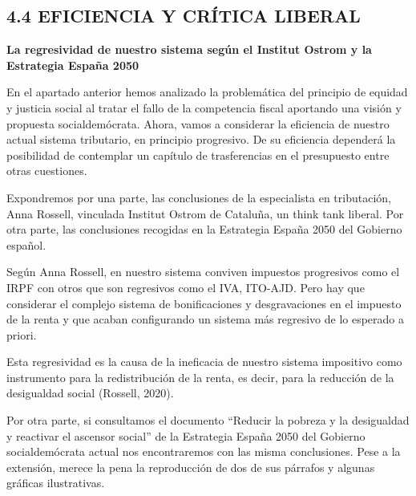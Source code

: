 \documentclass[
]{article}
\begin{document}
\hypertarget{eficiencia-y-cruxedtica-liberal}{%
\subsection{4.4 EFICIENCIA Y CRÍTICA
LIBERAL}\label{eficiencia-y-cruxedtica-liberal}}

\textbf{La regresividad de nuestro sistema según el Institut Ostrom y la
Estrategia España 2050}

En el apartado anterior hemos analizado la problemática del principio de
equidad y justicia social al tratar el fallo de la competencia fiscal
aportando una visión y propuesta socialdemócrata. Ahora, vamos a
considerar la eficiencia de nuestro actual sistema tributario, en
principio progresivo. De su eficiencia dependerá la posibilidad de
contemplar un capítulo de trasferencias en el presupuesto entre otras
cuestiones.

Expondremos por una parte, las conclusiones de la especialista en
tributación, Anna Rossell, vinculada Institut Ostrom de Cataluña, un
think tank liberal. Por otra parte, las conclusiones recogidas en la
Estrategia España 2050 del Gobierno español.

Según Anna Rossell, en nuestro sistema conviven impuestos progresivos
como el IRPF con otros que son regresivos como el IVA, ITO-AJD. Pero hay
que considerar el complejo sistema de bonificaciones y desgravaciones en
el impuesto de la renta y que acaban configurando un sistema más
regresivo de lo esperado a priori.

Esta regresividad es la causa de la ineficacia de nuestro sistema
impositivo como instrumento para la redistribución de la renta, es
decir, para la reducción de la desigualdad social (Rossell, 2020).

Por otra parte, si consultamos el documento ``Reducir la pobreza y la
desigualdad y reactivar el ascensor social'' de la Estrategia España
2050 del Gobierno socialdemócrata actual nos encontraremos con las misma
conclusiones. Pese a la extensión, merece la pena la reproducción de dos
de sus párrafos y algunas gráficas ilustrativas.
\end{document}
